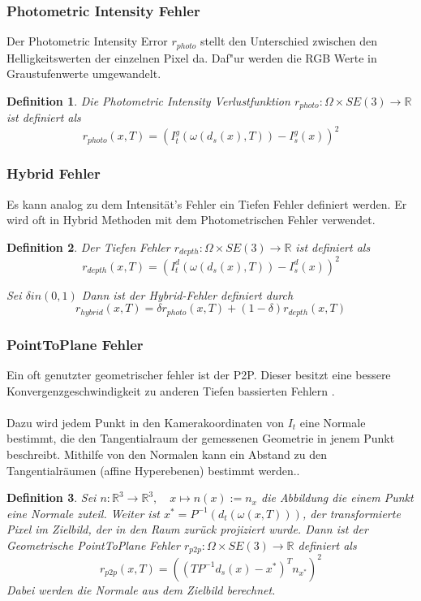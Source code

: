 \documentclass[12pt,DIV=15,BCOR=15mm,twoside,headsepline,abstract=true,listof=totoc,bibliography=totoc]{scrreprt}
\newtheorem{defi}{Definition}
\theoremstyle{remark}    %
\begin{document}
    \subsubsection{Photometric Intensity Fehler}
    
    Der Photometric Intensity Error $r_{photo}$ stellt den Unterschied zwischen den Helligkeitswerten der einzelnen Pixel da. Daf"ur werden die RGB Werte
    in Graustufenwerte umgewandelt.
    \begin{defi}
        Die Photometric Intensity Verlustfunktion $r_{photo}:\Omega \times SE(3) \to \mathbb{R}$ ist definiert als 
        \[
        r_{photo}(x, T) = ( I_t^g(\omega(d_s(x), T)) - I_s^g(x))^2
        \]

    \end{defi} \cite{Park_2017_ICCV,steinbruecker2011real}

    \subsubsection{Hybrid Fehler}
    Es kann analog zu dem Intensität's Fehler ein Tiefen Fehler definiert werden. Er wird oft in Hybrid Methoden mit dem Photometrischen Fehler verwendet. 
    \begin{defi}
        Der Tiefen Fehler $r_{depth}:\Omega \times SE(3) \to \mathbb{R}$ ist definiert als
        \[
            r_{depth}(x,T)= (I_t^d(\omega(d_s(x), T)) - I_s^d(x))^2
        \]

        Sei $\delta in (0,1)$ Dann ist der Hybrid-Fehler definiert durch 
        \[
            r_{hybrid}(x,T)= \delta r_{photo}(x, T) + (1-\delta)r_{depth}(x,T)
        \]
    \end{defi} 
    
    \subsubsection{PointToPlane Fehler}
    Ein oft genutzter geometrischer fehler ist der \ac{P2P}. Dieser besitzt eine bessere Konvergenzgeschwindigkeit zu anderen Tiefen
    bassierten Fehlern \cite{rusinkiewicz2001efficient}.\\\\
    Dazu wird jedem Punkt in den Kamerakoordinaten von $I_t$ eine Normale bestimmt, die den Tangentialraum der gemessenen Geometrie in jenem Punkt
    beschreibt. Mithilfe von den Normalen kann ein Abstand zu den Tangentialräumen (affine Hyperebenen) bestimmt werden.\cite{Park_2017_ICCV, Zhou2018}.
    \begin{defi}
        Sei $n:\mathbb{R}^3 \to \mathbb{R}^3, \hspace{1em} x \mapsto n(x):= n_x$ die Abbildung die einem Punkt eine Normale zuteil. 
        Weiter ist $x^* = P^{-1}(d_t(\omega(x, T)))$, der transformierte Pixel im Zielbild, der in den Raum zurück 
        projiziert wurde. Dann ist der Geometrische PointToPlane Fehler 
        $r_{p2p}:\Omega \times SE(3) \to \mathbb{R}$ definiert als
        \[
            r_{p2p}(x,T)= ((TP^{-1}d_s(x) - x^*)^Tn_{x^*})^2
        \]
        Dabei werden die Normale aus dem Zielbild berechnet.
    \end{defi}
\end{document}
